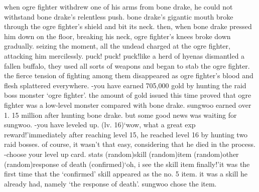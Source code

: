 when ogre fighter withdrew one of his arms from bone drake, he could not withstand bone drake’s relentless push.
bone drake’s gigantic mouth broke through the ogre fighter’s shield and bit its neck.
then, when bone drake pressed him down on the floor, breaking his neck, ogre fighter’s knees broke down gradually.
seizing the moment, all the undead charged at the ogre fighter, attacking him mercilessly.
puck! puck! puck!like a herd of hyenas dismantled a fallen buffalo, they used all sorts of weapons and began to stab the ogre fighter.
the fierce tension of fighting among them disappeared as ogre fighter’s blood and flesh splattered everywhere.
-you have earned 705,000 gold by hunting the raid boss monster ‘ogre fighter’.
the amount of gold issued this time proved that ogre fighter was a low-level monster compared with bone drake.
 sungwoo earned over 1.
15 million after hunting bone drake.
but some good news was waiting for sungwoo.
-you have leveled up.
 (lv.
 16)‘wow, what a great exp reward!’immediately after reaching level 15, he reached level 16 by hunting two raid bosses.
of course, it wasn’t that easy, considering that he died in the process.
-choose your level up card.
stats (random)skill (random)item (random)other (random)response of death (confirmed)‘oh, i see the skill item finally!’it was the first time that the ‘confirmed’ skill appeared as the no.
 5 item.
 it was a skill he already had, namely ‘the response of death’.
 sungwoo chose the item.


 